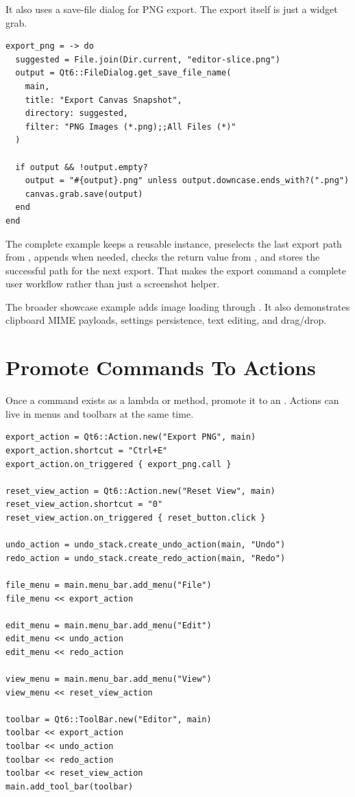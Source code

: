 It also uses a save-file dialog for PNG export. The export itself is just a widget grab.

\begin{lstlisting}[style=crystal]
export_png = -> do
  suggested = File.join(Dir.current, "editor-slice.png")
  output = Qt6::FileDialog.get_save_file_name(
    main,
    title: "Export Canvas Snapshot",
    directory: suggested,
    filter: "PNG Images (*.png);;All Files (*)"
  )

  if output && !output.empty?
    output = "#{output}.png" unless output.downcase.ends_with?(".png")
    canvas.grab.save(output)
  end
end
\end{lstlisting}

The complete example keeps a reusable  instance, preselects the last export path from , appends  when needed, checks the return value from , and stores the successful path for the next export. That makes the export command a complete user workflow rather than just a screenshot helper.

The broader showcase example adds image loading through . It also demonstrates clipboard MIME payloads, settings persistence, text editing, and drag/drop.

\section{Promote Commands To Actions}

Once a command exists as a lambda or method, promote it to an . Actions can live in menus and toolbars at the same time.

\begin{lstlisting}[style=crystal]
export_action = Qt6::Action.new("Export PNG", main)
export_action.shortcut = "Ctrl+E"
export_action.on_triggered { export_png.call }

reset_view_action = Qt6::Action.new("Reset View", main)
reset_view_action.shortcut = "0"
reset_view_action.on_triggered { reset_button.click }

undo_action = undo_stack.create_undo_action(main, "Undo")
redo_action = undo_stack.create_redo_action(main, "Redo")

file_menu = main.menu_bar.add_menu("File")
file_menu << export_action

edit_menu = main.menu_bar.add_menu("Edit")
edit_menu << undo_action
edit_menu << redo_action

view_menu = main.menu_bar.add_menu("View")
view_menu << reset_view_action

toolbar = Qt6::ToolBar.new("Editor", main)
toolbar << export_action
toolbar << undo_action
toolbar << redo_action
toolbar << reset_view_action
main.add_tool_bar(toolbar)
\end{lstlisting}

